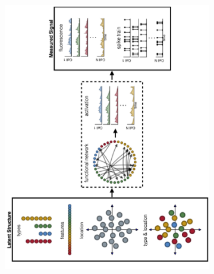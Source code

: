 \begin{figure}[t]
  \centering
  \begin{subfigure}[t]{5.5in}
    \centering
    \includegraphics[width=\textwidth]{figures/ch3/figure1}

\end{subfigure}
\end{figure}

